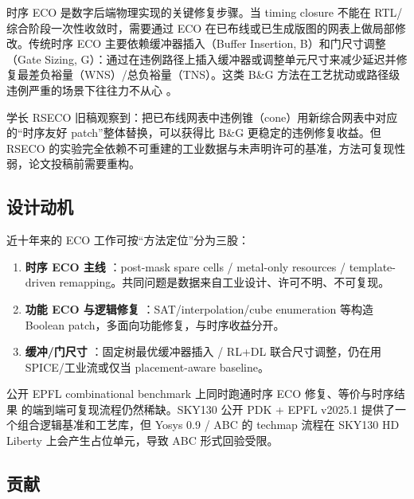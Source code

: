 \documentclass[journal]{IEEEtran}
\begin{document}
时序 ECO 是数字后端物理实现的关键修复步骤。当 timing closure 不能在 RTL/综合阶段一次性收敛时，需要通过 ECO 在已布线或已生成版图的网表上做局部修改。传统时序 ECO 主要依赖缓冲器插入（Buffer Insertion, B）和门尺寸调整（Gate Sizing, G）：通过在违例路径上插入缓冲器或调整单元尺寸来减少延迟并修复最差负裕量（WNS）/总负裕量（TNS）。这类 B\&G 方法在工艺扰动或路径级违例严重的场景下往往力不从心 \cite{ho2010eco,chen2012metal,chen2012fixability,liang2012buffer}。

学长 RSECO 旧稿观察到：把已布线网表中违例锥（cone）用新综合网表中对应的“时序友好 patch”整体替换，可以获得比 B\&G 更稳定的违例修复收益。但 RSECO 的实验完全依赖不可重建的工业数据与未声明许可的基准，方法可复现性弱，论文投稿前需要重构。

\subsection{设计动机}

近十年来的 ECO 工作可按“方法定位”分为三股：

\begin{enumerate}
  \item \textbf{时序 ECO 主线} \cite{ho2010eco,ho2012treco,kravets2019symbolic,chen2012metal,chen2012fixability,wang2012nego}：post-mask spare cells / metal-only resources / template-driven remapping。共同问题是数据来自工业设计、许可不明、不可复现。
  \item \textbf{功能 ECO 与逻辑修复} \cite{ho2008ecomap,jiang2010fraig,lin2011simult,lin2012multipatch,li2013intuitive,jiang2016resource,luo2016unified,zhuo2018patch}：SAT/interpolation/cube enumeration 等构造 Boolean patch，多面向功能修复，与时序收益分开。
  \item \textbf{缓冲/门尺寸} \cite{liang2012buffer,liu2021rlsizer,huang2025phys,chen2024aito,li2025mlbuf,zhang2025buffalo}：固定树最优缓冲器插入 / RL+DL 联合尺寸调整，仍在用 SPICE/工业流或仅当 placement-aware baseline。
\end{enumerate}

公开 EPFL combinational benchmark 上同时跑通时序 ECO 修复、等价与时序结果 的端到端可复现流程仍然稀缺。SKY130 公开 PDK + EPFL v2025.1 提供了一个组合逻辑基准和工艺库，但 Yosys 0.9 / ABC 的 techmap 流程在 SKY130 HD Liberty 上会产生占位单元，导致 ABC 形式回验受限。

\subsection{贡献}
\end{document}
